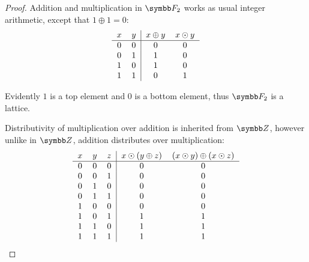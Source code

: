 \begin{proof}
  Addition and multiplication in \( \F_2 \) works as usual integer arithmetic, except that \( 1 \oplus 1 = 0 \):
  \begin{equation*}
    \begin{tabular}{c c | c c}
      \( x \)    & \( y \)    & \( x \oplus y \) & \( x \odot y \) \\
      \hline
      \( 0 \)    & \( 0 \)    & \( 0 \)          & \( 0 \) \\
      \( 0 \)    & \( 1 \)    & \( 1 \)          & \( 0 \) \\
      \( 1 \)    & \( 0 \)    & \( 1 \)          & \( 0 \) \\
      \( 1 \)    & \( 1 \)    & \( 0 \)          & \( 1 \)
    \end{tabular}
  \end{equation*}

  Evidently \( 1 \) is a top element and \( 0 \) is a bottom element, thus \( \F_2 \) is a lattice.

  Distributivity of multiplication over addition is inherited from \( \Z \), however unlike in \( \Z \), addition distributes over multiplication:
  \begin{equation*}
    \begin{tabular}{c c c | c c}
      \( x \)    & \( y \)    & \( z \)    & \(x \odot (y \oplus z) \) & \( (x \odot y) \oplus (x \odot z) \) \\
      \hline
      \( 0 \)    & \( 0 \)    & \( 0 \)    & \( 0 \)                   & \( 0 \) \\
      \( 0 \)    & \( 0 \)    & \( 1 \)    & \( 0 \)                   & \( 0 \) \\
      \( 0 \)    & \( 1 \)    & \( 0 \)    & \( 0 \)                   & \( 0 \) \\
      \( 0 \)    & \( 1 \)    & \( 1 \)    & \( 0 \)                   & \( 0 \) \\
      \( 1 \)    & \( 0 \)    & \( 0 \)    & \( 0 \)                   & \( 0 \) \\
      \( 1 \)    & \( 0 \)    & \( 1 \)    & \( 1 \)                   & \( 1 \) \\
      \( 1 \)    & \( 1 \)    & \( 0 \)    & \( 1 \)                   & \( 1 \) \\
      \( 1 \)    & \( 1 \)    & \( 1 \)    & \( 1 \)                   & \( 1 \)
    \end{tabular}
  \end{equation*}


\end{proof}

